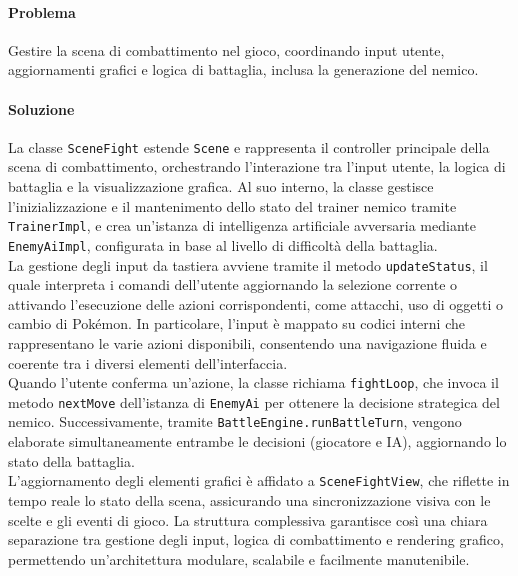 \documentclass[a4paper,12pt]{report}
\begin{document}
{{\paragraph{Problema}
Gestire la scena di combattimento nel gioco, coordinando input utente, aggiornamenti grafici e logica di battaglia, inclusa la generazione del nemico.

\paragraph{Soluzione}
La classe \texttt{SceneFight} estende \texttt{Scene} e rappresenta il controller principale della scena di combattimento, orchestrando l’interazione tra l’input utente, la logica di battaglia e la visualizzazione grafica. Al suo interno, la classe gestisce l’inizializzazione e il mantenimento dello stato del trainer nemico tramite \texttt{TrainerImpl}, e crea un’istanza di intelligenza artificiale avversaria mediante \texttt{EnemyAiImpl}, configurata in base al livello di difficoltà della battaglia.\\
La gestione degli input da tastiera avviene tramite il metodo \texttt{updateStatus}, il quale interpreta i comandi dell’utente aggiornando la selezione corrente o attivando l’esecuzione delle azioni corrispondenti, come attacchi, uso di oggetti o cambio di Pokémon. In particolare, l’input è mappato su codici interni che rappresentano le varie azioni disponibili, consentendo una navigazione fluida e coerente tra i diversi elementi dell’interfaccia.\\
Quando l’utente conferma un’azione, la classe richiama \texttt{fightLoop}, che invoca il metodo \texttt{nextMove} dell’istanza di \texttt{EnemyAi} per ottenere la decisione strategica del nemico. Successivamente, tramite \texttt{BattleEngine.runBattleTurn}, vengono elaborate simultaneamente entrambe le decisioni (giocatore e IA), aggiornando lo stato della battaglia.\\
L’aggiornamento degli elementi grafici è affidato a \texttt{SceneFightView}, che riflette in tempo reale lo stato della scena, assicurando una sincronizzazione visiva con le scelte e gli eventi di gioco. La struttura complessiva garantisce così una chiara separazione tra gestione degli input, logica di combattimento e rendering grafico, permettendo un’architettura modulare, scalabile e facilmente manutenibile.

}}
\end{document}
